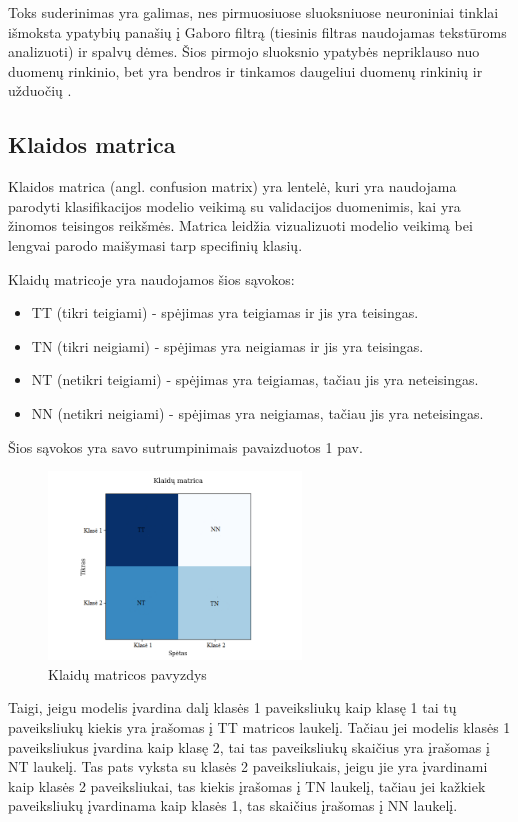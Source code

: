 \documentclass{VUMIFPSbakalaurinis}
\begin{document}
Toks suderinimas yra galimas, nes pirmuosiuose sluoksniuose neuroniniai tinklai išmoksta ypatybių panašių į Gaboro filtrą 
(tiesinis filtras naudojamas tekstūroms analizuoti) ir spalvų dėmes. Šios pirmojo sluoksnio ypatybės nepriklauso nuo duomenų rinkinio, bet yra bendros ir tinkamos 
daugeliui duomenų rinkinių ir užduočių \cite{DBLP:journals/corr/YosinskiCBL14}.

\subsection{Klaidos matrica}
Klaidos matrica (angl. confusion matrix) yra lentelė, kuri yra naudojama parodyti klasifikacijos modelio veikimą su validacijos duomenimis, kai yra žinomos teisingos reikšmės. Matrica leidžia vizualizuoti modelio veikimą bei lengvai parodo maišymasi tarp specifinių klasių.

Klaidų matricoje yra naudojamos šios sąvokos:
\begin{itemize}
    \item TT (tikri teigiami) - spėjimas yra teigiamas ir jis yra teisingas.
    \item TN (tikri neigiami) - spėjimas yra neigiamas ir jis yra teisingas.
    \item NT (netikri teigiami) - spėjimas yra teigiamas, tačiau jis yra neteisingas.
    \item NN (netikri neigiami) - spėjimas yra neigiamas, tačiau jis yra neteisingas.
\end{itemize}

Šios sąvokos yra savo sutrumpinimais pavaizduotos 1 pav. 
\begin{figure}[H]
    \centering
    \includegraphics[width=0.6\textwidth]{img/KlaiduMatrica.png}
    \caption{Klaidų matricos pavyzdys}
    \label{fig:architecture}
\end{figure}
Taigi, jeigu modelis įvardina dalį klasės 1 paveiksliukų kaip klasę 1 tai tų paveiksliukų kiekis yra įrašomas į TT matricos laukelį. Tačiau jei modelis klasės 1 paveiksliukus įvardina kaip klasę 2, tai tas paveiksliukų skaičius yra įrašomas į NT laukelį. Tas pats vyksta su klasės 2 paveiksliukais, jeigu jie yra įvardinami kaip klasės 2 paveiksliukai, tas kiekis įrašomas į TN laukelį, tačiau jei kažkiek paveiksliukų įvardinama kaip klasės 1, tas skaičius įrašomas į NN laukelį. 
\end{document}
